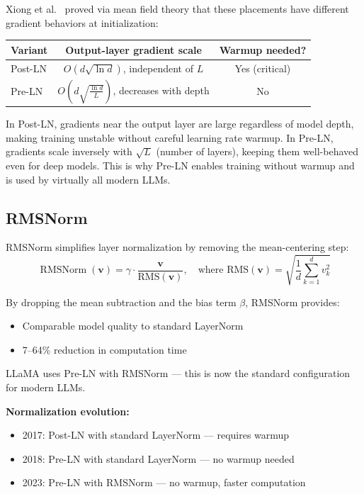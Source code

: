 \documentclass[11pt,a4paper]{article}
\newcommand{\RMSNorm}{\operatorname{RMSNorm}}
\begin{document}
Xiong et al.\ \cite{xiong2020} proved via mean field theory that these placements have
different gradient behaviors at initialization:

\begin{center}
\begin{tabular}{lcc}
\toprule
\textbf{Variant} & \textbf{Output-layer gradient scale} & \textbf{Warmup needed?} \\
\midrule
Post-LN & $O(d\sqrt{\ln d})$, independent of $L$ & Yes (critical) \\
Pre-LN  & $O\!\left(d\sqrt{\frac{\ln d}{L}}\right)$, decreases with depth & No \\
\bottomrule
\end{tabular}
\end{center}

In Post-LN, gradients near the output layer are large regardless of model depth,
making training unstable without careful learning rate warmup. In Pre-LN, gradients
scale inversely with $\sqrt{L}$ (number of layers), keeping them well-behaved even for
deep models. This is why Pre-LN enables training without warmup and is used by virtually
all modern LLMs.

\subsection{RMSNorm}
\label{sec:rmsnorm}

RMSNorm \cite{zhang2019} simplifies layer normalization by removing the mean-centering
step:
\begin{equation}
  \RMSNorm(\bm{v}) = \gamma \cdot \frac{\bm{v}}{\text{RMS}(\bm{v})},
  \quad \text{where } \text{RMS}(\bm{v}) = \sqrt{\frac{1}{d}\sum_{k=1}^{d} v_k^2}
\end{equation}

By dropping the mean subtraction and the bias term $\beta$, RMSNorm provides:
\begin{itemize}[nosep]
  \item Comparable model quality to standard LayerNorm
  \item 7--64\% reduction in computation time \cite{zhang2019}
\end{itemize}

LLaMA \cite{touvron2023} uses Pre-LN with RMSNorm --- this is now the standard
configuration for modern LLMs.

\begin{evobox}
\textbf{Normalization evolution:}
\begin{itemize}[nosep]
  \item 2017: Post-LN with standard LayerNorm \cite{vaswani2017} --- requires warmup
  \item 2018: Pre-LN with standard LayerNorm \cite{radford2018} --- no warmup needed
  \item 2023: Pre-LN with RMSNorm \cite{touvron2023} --- no warmup, faster computation
\end{itemize}
\end{evobox}
\end{document}
